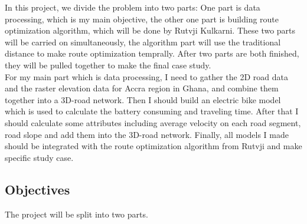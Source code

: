\documentclass[project-plan]{report-template}
\begin{document}
In this project, we divide the problem into two parts: One part is data processing, which is my main objective, the other one part is building route optimization algorithm, which will be done by Rutvji Kulkarni.
These two parts will be carried on simultaneously, the algorithm part will use the traditional distance to make route optimization temprally.
After two parts are both finished, they will be pulled together to make the final case study.\\

For my main part which is data processing, I need to gather the 2D road data and the raster elevation data for Accra region in Ghana, and combine them together into a 3D-road network.
Then I should build an electric bike model which is used to calculate the battery consuming and traveling time.
After that I should calculate some attributes including average velocity on each road segment, road slope and add them into the 3D-road network.
Finally, all models I made should be integrated with the route optimization algorithm from Rutvji and make specific study case.

\subsection {Objectives}
The project will be split into two parts. 
\end{document}
